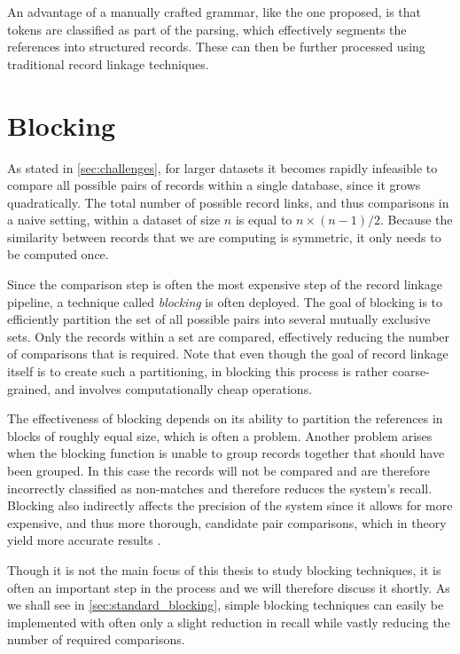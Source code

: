 An advantage of a manually crafted grammar, like the one proposed, is that tokens are classified as part of the parsing, which effectively segments the references into structured records.
These can then be further processed using traditional record linkage techniques.




\section{Blocking}
\label{sec:blocking}

As stated in \cref{sec:challenges}, for larger datasets it becomes rapidly infeasible to compare all possible pairs of records within a single database, since it grows quadratically.
The total number of possible record links, and thus comparisons in a naive setting, within a dataset of size $n$ is equal to $n\times(n-1)/2$.
Because the similarity between records that we are computing is symmetric, it only needs to be computed once.

Since the comparison step is often the most expensive step of the record linkage pipeline, a technique called \emph{blocking} is often deployed.
The goal of blocking is to efficiently partition the set of all possible pairs into several mutually exclusive sets.
Only the records within a set are compared, effectively reducing the number of comparisons that is required.
Note that even though the goal of record linkage itself is to create such a partitioning, in blocking this process is rather coarse-grained, and involves computationally cheap operations.

The effectiveness of blocking depends on its ability to partition the references in blocks of roughly equal size, which is often a problem.
Another problem arises when the blocking function is unable to group records together that should have been grouped.
In this case the records will not be compared and are therefore incorrectly classified as non-matches and therefore reduces the system's recall.
Blocking also indirectly affects the precision of the system since it allows for more expensive, and thus more thorough, candidate pair comparisons, which in theory yield more accurate results \citep{Baxter2003}.

Though it is not the main focus of this thesis to study blocking techniques, it is often an important step in the process and we will therefore discuss it shortly.
As we shall see in \cref{sec:standard_blocking}, simple blocking techniques can easily be implemented with often only a slight reduction in recall while vastly reducing the number of required comparisons.


